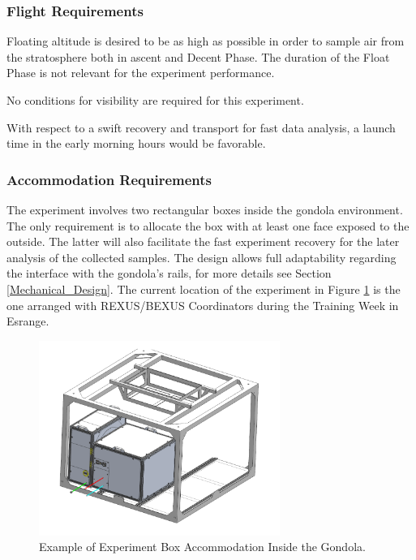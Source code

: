 \subsubsection{Flight Requirements}

Floating altitude is desired to be as high as possible in order to sample air from the stratosphere both in ascent and Decent Phase. The duration of the Float Phase is not relevant for the experiment performance. 

\smallskip
No conditions for visibility are required for this experiment.

\smallskip
With respect to a swift recovery and transport for fast data analysis, a launch time in the early morning hours would be favorable.

\pagebreak
\subsubsection{Accommodation Requirements}

The experiment involves two rectangular boxes inside the gondola environment. The only requirement is to allocate the box with at least one face exposed to the outside. The latter will also facilitate the fast experiment recovery for the later analysis of the collected samples. The design allows full adaptability regarding the interface with the gondola's rails, for more details see Section \ref{Mechanical_Design}. The current location of the experiment in Figure \ref{goldola_accommodation} is the one arranged with REXUS/BEXUS Coordinators during the Training Week in Esrange.

\begin{figure}[H]
    \centering
    \includegraphics[width=0.7\textwidth]{6-launch-campaign-preparation/img/Gondola_Placement.PNG}
    \caption{Example of Experiment Box Accommodation Inside the Gondola.}
    \label{goldola_accommodation}
\end{figure}